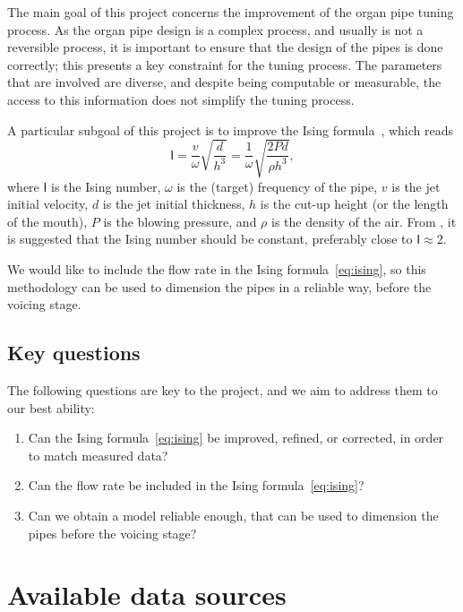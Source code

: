 \documentclass{psu-report}
\begin{document}
The main goal of this project concerns the improvement of the organ pipe tuning
process.
As the organ pipe design is a complex process, and usually is not a reversible
process, it is important to ensure that the design of the pipes is done
correctly; this presents a key constraint for the tuning process.
The parameters that are involved are diverse, and despite being computable or
measurable, the access to this information does not simplify the tuning process.

A particular subgoal of this project is to improve the Ising
formula~\autocite{1971Ising-1}, which reads
\begin{equation}
    \label{eq:ising}
    \mathsf{I}
    =
    \frac{v}{\omega}\sqrt{\frac{d}{h^3}}
    =
    \frac{1}{\omega}\sqrt{\frac{2 P d}{\rho h^3}},
\end{equation}
where \(\mathsf{I}\) is the Ising number, \(\omega\) is the (target) frequency
of the pipe, \(v\) is the jet initial velocity, \(d\) is the jet initial
thickness, \(h\) is the cut-up height (or the length of the mouth), \(P\) is the
blowing pressure, and \(\rho\) is the density of the air.
From \autocite{1971Ising-1, 2025Lilj-1}, it is suggested that the Ising number
should be constant, preferably close to \( \mathsf{I} \approx 2\).

We would like to include the flow rate in the Ising formula~\ref{eq:ising}, so
this methodology can be used to dimension the pipes in a reliable way, before
the voicing stage.

\subsection{Key questions}

The following questions are key to the project, and we aim to address them to
our best ability:
\begin{enumerate}
    \item Can the Ising formula~\ref{eq:ising} be improved, refined, or
        corrected, in order to match measured data?
    \item Can the flow rate be included in the Ising formula~\ref{eq:ising}?
    \item Can we obtain a model reliable enough, that can be used to dimension the
        pipes before the voicing stage?
\end{enumerate}

\section{Available data sources}
\end{document}
